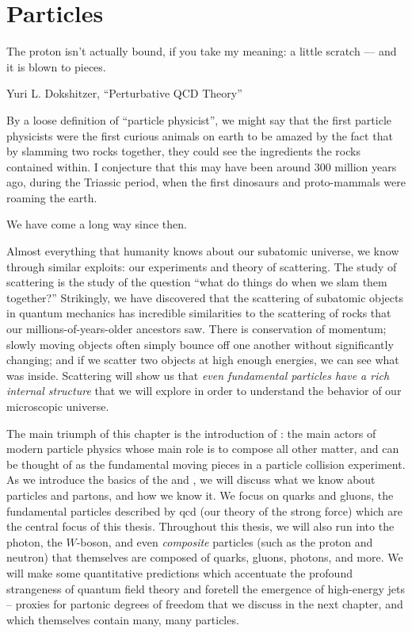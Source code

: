 \chapter[Particles]{Particles}

\label{chap:particles}


\epigraph{The proton isn’t actually bound, if you take my meaning: a little scratch — and it is blown to pieces.}{Yuri L. Dokshitzer, ``Perturbative QCD Theory'' \cite{Dokshitzer:1998nz}}

By a loose definition of ``particle physicist'', we might say that the first particle physicists were the first curious animals on earth to be amazed by the fact that by slamming two rocks together, they could see the ingredients the rocks contained within.
%
I conjecture that this may have been around 300 million years ago, during the Triassic period, when the first dinosaurs and proto-mammals were roaming the earth.


We have come a long way since then.


Almost everything that humanity knows about our subatomic universe, we know through similar exploits:
%
our experiments and theory of scattering.
%
The study of scattering is the study of the question ``what do things do when we slam them together?''
%
Strikingly, we have discovered that the scattering of subatomic objects in quantum mechanics has incredible similarities to the scattering of rocks that our millions-of-years-older ancestors saw.
%
There is conservation of momentum;
%
slowly moving objects often simply bounce off one another without significantly changing;
%
and if we scatter two objects at high enough energies, we can see what was inside.
%
Scattering will show us that \emph{even \textit{fundamental} particles have a rich internal structure} that we will explore in order to understand the behavior of our microscopic universe.


The main triumph of this chapter is the introduction of :
%
the main actors of modern particle physics whose main role is to compose all other matter, and can be thought of as the fundamental moving pieces in a particle collision experiment.
%
As we introduce the basics of the  and , we will discuss what we know about particles and partons, and how we know it.
%
We focus on quarks and gluons, the fundamental particles described by \gls{qcd} (our theory of the strong force) which are the central focus of this thesis.
%
Throughout this thesis, we will also run into the photon, the \(W\)-boson, and even \textit{composite} particles (such as the proton and neutron) that themselves are composed of quarks, gluons, photons, and more.
%
We will make some quantitative predictions which accentuate the profound strangeness of quantum field theory and foretell the emergence of high-energy jets -- proxies for partonic degrees of freedom that we discuss in the next chapter, and which themselves contain many, many particles.

